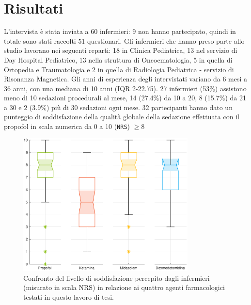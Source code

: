 \chapter{Risultati}

L'intervista è stata inviata a 60 infermieri: 9 non hanno partecipato, quindi in totale sono stati raccolti 51 questionari. Gli infermieri che hanno preso parte allo studio lavorano nei seguenti reparti: 18 in Clinica Pediatrica, 13 nel servizio di Day Hospital Pediatrico, 13 nella struttura di Oncoematologia, 5 in quella di Ortopedia e Traumatologia e 2 in quella di Radiologia Pediatrica - servizio di Risonanza Magnetica. Gli anni di esperienza degli intervistati variano da 6 mesi a 36 anni, con una mediana di 10 anni (IQR 2-22.75). 27 infermieri (53$\%$) assistono meno di 10 sedazioni procedurali al mese, 14 (27.4$\%$) da 10 a 20, 8 (15.7$\%$) da 21 a 30 e 2 (3.9$\%$) più di 30 sedazioni ogni mese. 32 partecipanti hanno dato un punteggio di soddisfazione della qualità globale della sedazione effettuata con il propofol in scala numerica da 0 a 10 (\texttt{NRS}) $\geq$8 

\begin{figure}[h]
    \centering
    \includegraphics[width=0.8\textwidth]{Figure/qualita-colorful.pdf}
    \caption{Confronto del livello di soddisfazione percepito dagli infermieri (misurato in scala NRS) in relazione ai quattro agenti farmacologici testati in questo lavoro di tesi.}
    \label{fig:qualitascolorful}
\end{figure}

